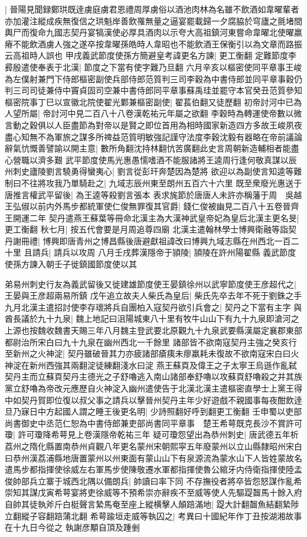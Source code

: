 |{
	晉陽見聞録鄭珙既逹虜庭虜君恩禮周厚虜俗以酒池肉林為名雖不飲酒如韋曜輩者亦加灌注縱成疾無復信之珙魁岸善飲罹無量之逼宴罷載歸一夕腐脇於穹廬之氈堵間輿尸而復命九國志契丹宴犒漢使必厚具酒肉以示夸大高祖鎮河東嘗命韋曜北使曜羸瘠不能飲酒虜人強之遂卒按韋曜孫皓時人韋昭也不能飲酒王保衡引以為文章而路振云高祖時人誤也}
甲戌義武節度使孫方簡避皇考諱更名方諫|{
	更工衡翻}
定難節度李彛殷遣使奉表于北漢|{
	節度之下當有使字難乃旦翻}
六月辛亥以樞密使同平章事王峻為左僕射兼門下侍郎樞密副使兵部侍郎范質判三司李穀為中書侍郎並同平章事穀仍判三司司徒兼侍中竇貞固司空兼中書侍郎同平章事蘇禹珪並罷守本官癸丑范質參知樞密院事丁巳以宣徽北院使翟光鄴兼樞密副使|{
	翟萇伯翻又徒歷翻}
初帝討河中已為人望所屬|{
	帝討河中見二百八十八卷漢乾祐元年屬之欲翻}
李穀時為轉運使帝數以微言動之穀俱以人臣盡節為對帝以是賢之即位首用為相時國家新造四方多故王峻夙夜盡心知無不為軍旅之謀多所禆益范質明敏強記謹守法度李穀沈毅有器略在帝前議論辭氣忼慨善譬諭以開主意|{
	數所角翻沈持林翻忼苦廣翻此史言周朝新造輔相者能盡心營職以濟多艱}
武平節度使馬光惠愚懦嗜酒不能服諸將王逵周行逢何敬真謀以辰州刺史廬陵劉言驍勇得蠻夷心|{
	劉言從彭玕奔楚因為楚將}
欲迎以為副使言知逵等難制曰不往將攻我乃單騎赴之|{
	九域志辰州東至朗州五百六十六里}
既至衆廢光惠送于唐推言權武平留後|{
	為王逵等殺劉言張本}
表求旄節於唐唐人未許亦稱藩于周　吳越王弘俶以前内外馬步都統軍使仁俊無罪復其官爵|{
	錢仁俊被幽見二百八十五卷晉齊王開運二年}
契丹遣燕王蘇葉等冊命北漢主為大漢神武皇帝妃為皇后北漢主更名旻|{
	更工衡翻}
秋七月|{
	按五代會要是月周追尊四廟}
北漢主遣翰林學士博興衛融等詣契丹謝冊禮|{
	博興即唐青州之博昌縣後唐避獻祖諱改曰博興九域志縣在州西北一百二十里}
且請兵|{
	請兵以攻周}
八月壬戌葬漢隱帝于頴陵|{
	頴陵在許州陽翟縣}
義武節度使孫方諫入朝壬子徙鎮國節度使以其

弟易州刺史行友為義武留後又徙建雄節度使王晏鎮徐州以武寧節度使王彦超代之|{
	王晏與王彦超兩易所鎮}
戊午追立故夫人柴氏為皇后|{
	柴氏先卒去年不死于劉銖之手}
九月北漢主遣招討使李存瓌將兵自團柏入寇契丹欲引兵會之|{
	契丹之下當有主字}
與酋長議於九十九泉|{
	魏上地記曰沮陽城東八十里有牧牛山山下有九十九泉即滄河之上源也按魏收魏書天賜三年八月魏主登武要北原觀九十九泉武要縣漢屬定襄郡東部都尉治所宋白曰九十九泉在幽州西北一千餘里}
諸部皆不欲南寇契丹主強之癸亥行至新州之火神淀|{
	契丹雖破晉其力亦疲諸部瘡痍未瘳羸耗未復故不欲南寇宋白曰火神淀在新州西強其兩翻淀徒練翻淺水曰淀}
燕王蘇頁及偉王之子太寧王烏遜作亂弑契丹主而立蘇頁契丹主德光之子舒嚕逃入南山諸部奉舒嚕以攻蘇頁舒嚕殺之并其族黨立舒嚕為帝改元應歷自火神淀入幽州遣使告于北漢北漢主遣樞密直學士上黨王得中如契丹賀即位復以叔父事之請兵以擊晉州契丹主年少好遊戲不親國事每夜酣飲逹旦乃寐日中方起國人謂之睡王後更名明|{
	少詩照翻好呼到翻更工衡翻}
壬申蜀以吏部尚書御史中丞范仁恕為中書侍郎兼吏部尚書同平章事　楚王希萼既克長沙不賞許可瓊|{
	許可瓊降希萼見上卷漢隱帝乾祐三年}
疑可瓊怨望出為恭州刺史|{
	唐武德五年析荔州之隋化縣置南恭州貞觀八年更名蒙州宋朝熙寜五年廢蒙州以立山縣隸昭州宋白曰恭州漢荔浦縣地唐置蒙州以州東面有蒙山山下有泉源流為蒙水山下人皆姓蒙故名}
遣馬步都指揮使徐威左右軍馬步使陳敬遷水軍都指揮使魯公綰牙内侍衛指揮使陸孟俊帥部兵立寨于城西北隅以備朗兵|{
	帥讀曰率下同}
不存撫役者將卒皆怨怒謀作亂希崇知其謀戊寅希萼宴將吏徐威等不預希崇亦辭疾不至威等使人先驅踶齧馬十餘入府自帥其徒執斧斤白梃聲言縶馬奄至座上縱横擊人顛踣滿地|{
	踶大計翻齧魚結翻縶陟立翻縱子容翻踣蒲北翻}
希萼踰垣走威等執囚之|{
	考異曰十國紀年作丁丑按湖湘故事在十九日今從之}
執謝彦顒自頂及踵剉


